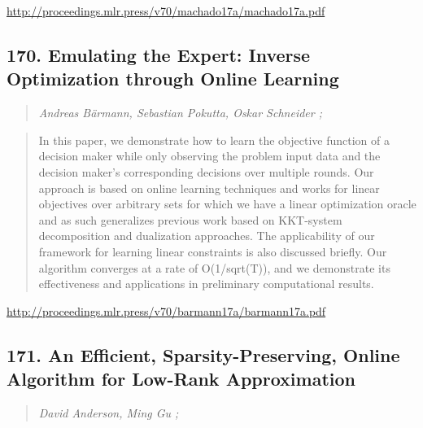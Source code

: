 \documentclass{article}
\begin{document}
\href{http://proceedings.mlr.press/v70/machado17a/machado17a.pdf}{http://proceedings.mlr.press/v70/machado17a/machado17a.pdf}

\subsection{170. Emulating the Expert: Inverse Optimization through Online Learning}

\begin{quote}
\footnotesize{\textit{Andreas Bärmann, Sebastian Pokutta, Oskar Schneider ;}}

\end{quote}

\begin{quote}
    In this paper, we demonstrate how to learn the objective function of a decision maker while only observing the problem input data and the decision maker’s corresponding decisions over multiple rounds. Our approach is based on online learning techniques and works for linear objectives over arbitrary sets for which we have a linear optimization oracle and as such generalizes previous work based on KKT-system decomposition and dualization approaches. The applicability of our framework for learning linear constraints is also discussed briefly. Our algorithm converges at a rate of O(1/sqrt(T)), and we demonstrate its effectiveness and applications in preliminary computational results.  
\end{quote}

\href{http://proceedings.mlr.press/v70/barmann17a/barmann17a.pdf}{http://proceedings.mlr.press/v70/barmann17a/barmann17a.pdf}

\subsection{171. An Efficient, Sparsity-Preserving, Online Algorithm for Low-Rank Approximation}

\begin{quote}
\footnotesize{\textit{David Anderson, Ming Gu ;}}

\end{quote}
\end{document}
